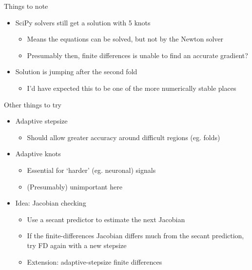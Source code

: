 \documentclass[presentation]{beamer}
\begin{document}
\begin{frame}[label={sec:org6113814}]{Things to note}
\begin{itemize}
\item SciPy solvers still get a solution with 5 knots
\begin{itemize}
\item Means the equations can be solved, but not by the Newton solver
\item Presumably then, finite differences is unable to find an accurate gradient?
\end{itemize}
\end{itemize}

\vfill
\begin{itemize}
\item Solution is jumping after the second fold
\begin{itemize}
\item I'd have expected this to be one of the more numerically stable places
\end{itemize}
\end{itemize}
\end{frame}

\begin{frame}[label={sec:org9b8f27f}]{Other things to try}
\begin{itemize}
\item Adaptive stepsize
\begin{itemize}
\item Should allow greater accuracy around difficult regions (eg. folds)
\end{itemize}
\end{itemize}
\vfill
\begin{itemize}
\item Adaptive knots
\begin{itemize}
\item Essential for `harder' (eg. neuronal) signals
\item (Presumably) unimportant here
\end{itemize}
\end{itemize}
\vfill
\begin{itemize}
\item Idea: Jacobian checking
\begin{itemize}
\item Use a secant predictor to estimate the next Jacobian
\item If the finite-differences Jacobian differs much from the secant prediction, try FD again with a new stepsize
\item Extension: adaptive-stepsize finite differences
\end{itemize}
\end{itemize}
\end{frame}
\end{document}
